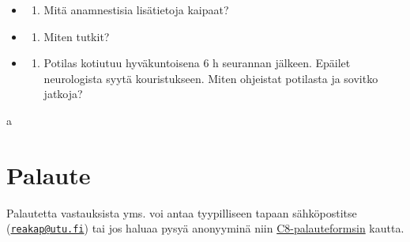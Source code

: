 \documentclass[
]{book}
\providecommand{\tightlist}{%
  \setlength{\itemsep}{0pt}\setlength{\parskip}{0pt}}
\begin{document}
\begin{itemize}
\tightlist
\item
  \begin{enumerate}
  \def\labelenumi{\alph{enumi}.}
  \tightlist
  \item
    Mitä anamnestisia lisätietoja kaipaat?
  \end{enumerate}
\item
  \begin{enumerate}
  \def\labelenumi{\alph{enumi}.}
  \setcounter{enumi}{1}
  \tightlist
  \item
    Miten tutkit?
  \end{enumerate}
\item
  \begin{enumerate}
  \def\labelenumi{\alph{enumi}.}
  \setcounter{enumi}{2}
  \tightlist
  \item
    Potilas kotiutuu hyväkuntoisena 6 h seurannan jälkeen. Epäilet neurologista syytä kouristukseen. Miten ohjeistat potilasta ja sovitko jatkoja?
  \end{enumerate}
\end{itemize}

a

\chapter{Palaute}\label{palaute}

Palautetta vastauksista yms. voi antaa tyypilliseen tapaan sähköpostitse (\href{mailto:reakap@utu.fi}{\nolinkurl{reakap@utu.fi}}) tai jos haluaa pysyä anonyyminä niin \href{https://docs.google.com/forms/d/e/1FAIpQLSdUj0WdEA7kq9Smq4HyxbSGYL0galemO9QOgfV-2HT-yRsqJw/viewform?usp=sharing&ouid=112689903880978617225}{C8-palauteformsin} kautta.


\end{document}
